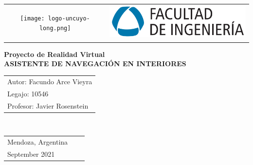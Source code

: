 \documentclass{article}
\newenvironment{standalone}{\begin{preview}}{\end{preview}}
\begin{document}
\begin{standalone}

  \begin{tabular*}{\textwidth}{@{\extracolsep{\fill}} cc}
    \texttt{[image: logo-uncuyo-long.png]}&
    \includegraphics[width=0.49\linewidth, height=18mm, keepaspectratio]{logo-fing.png}\\
  \end{tabular*}

  \vspace{4cm}

  \parbox{\textwidth}{
  \begin{center}
    \huge \textbf{%
    Proyecto de Realidad Virtual\\[1.5ex]
    }
    \HUGE \textbf{%
    ASISTENTE DE NAVEGACIÓN EN INTERIORES\\
    }
  \end{center}
  }

  \vfill

  {\fontsize{12}{12} \selectfont%
  \begin{tabular}{l}
    Autor: Facundo Arce Vieyra\\[1.5ex]
    Legajo: 10546\\[1.5ex]
    Profesor: Javier Rosenstein\\
  \end{tabular}
  }\\

  \vspace{0.75cm}

  {\fontsize{12pt}{12} \selectfont%
  \begin{tabular}{lcl}
    Mendoza, Argentina\\[1.5ex]
    September 2021\\
  \end{tabular}
  }


\end{standalone}
\end{document}
